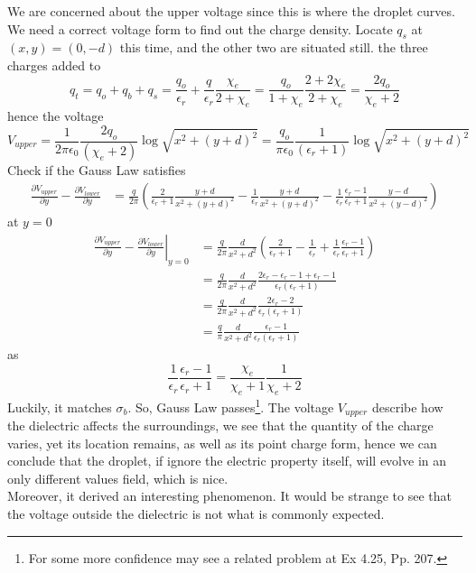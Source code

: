 We are concerned about the upper voltage since this is where the droplet curves. We need a correct voltage form to find out the charge density. Locate $q_s$ at $(x,y) = (0,-d)$ this time, and the other two are situated still.
the three charges added to
\[q_t=
q_o+q_b+q_s=\frac{q_o}{\epsilon_r}+\frac{q}{\epsilon_r}\frac{\chi_e}{2+\chi_e}=\frac{q_o}{1+\chi_e}\frac{2+2\chi_e}{2+\chi_e}=\frac{2q_o}{\chi_e+2}
\]
hence the voltage
\[
V_{upper}=\frac{1}{2\pi\epsilon_0}\frac{2 q_o}{({\chi_e+2})}\log\sqrt{x^2+(y+d)^2}=\frac{q_o}{\pi\epsilon_0}\frac{1}{(\epsilon_r+1)}\log\sqrt{x^2+(y+d)^2}
\]
Check if the Gauss Law satisfies
\begin{align*}
\frac{\partial V_{upper}}{\partial y}-\frac{\partial V_{lower}}{\partial y}&=\frac{q}{2\pi} \left( \frac{2}{\epsilon_r + 1} \frac{y + d}{x^2 + (y + d)^2} - \frac{1}{\epsilon_r} \frac{y + d}{x^2 + (y + d)^2} -\frac{1}{\epsilon_r} \frac{\epsilon_r-1}{\epsilon_r+1}\frac{y - d}{x^2 + (y - d)^2}\right)   
\end{align*}
at $y=0$
\begin{align*}
\left.\frac{\partial V_{upper}}{\partial y}-\frac{\partial V_{lower}}{\partial y}\right|_{y=0}&=\frac{q}{2\pi} \frac{d}{x^2 + d^2}\left( \frac{2}{\epsilon_r + 1} - \frac{1}{\epsilon_r} +\frac{1}{\epsilon_r}\frac{\epsilon_r-1}{\epsilon_r + 1}  \right) \\
    &=\frac{q}{2\pi}  \frac{d}{x^2 + d^2}  \frac{2\epsilon_r -\epsilon_r -1+\epsilon_r -1}{\epsilon_r(\epsilon_r + 1)} \\
    &=\frac{q}{2\pi}  \frac{d}{x^2 + d^2} \frac{2\epsilon_r -2}{\epsilon_r(\epsilon_r + 1)} \\
    &=\frac{q}{\pi}  \frac{d}{x^2 + d^2} \frac{\epsilon_r -1}{\epsilon_r(\epsilon_r + 1)}
\end{align*}
as
\[
\frac{1}{\epsilon_r}\frac{\epsilon_r -1}{\epsilon_r + 1}=\frac{\chi_e}{\chi_e +1}\frac{1}{\chi_e +2}
\]
Luckily, it matches $\sigma_b$.
So, Gauss Law passes\footnote{For some more confidence may see a related problem at \cite{Griffiths_2017} Ex 4.25, Pp. 207.}. The voltage $V_{upper}$ describe how the dielectric affects the surroundings, we see that the quantity of the charge varies, yet its location remains, as well as its point charge form, hence we can conclude that the droplet, if ignore the electric property itself, will evolve in an only different values field, which is nice.\\
\indent Moreover, it derived an interesting phenomenon. It would be strange to see that the voltage outside the dielectric is not what is commonly expected.
